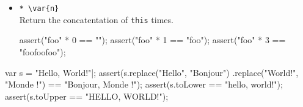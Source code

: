 \begin{itemize}
\item \lstinline|* \var{n}|\\
  Return the concatentation of \lstinline|this|  times.
\begin{urbiscript}
assert("foo" * 0 == "");
assert("foo" * 1 == "foo");
assert("foo" * 3 == "foofoofoo");
\end{urbiscript}
\end{itemize}

\begin{urbiscript}
var s = "Hello, World!\n"|;
assert(s.replace("Hello", "Bonjour")
        .replace("World!", "Monde !")
       == "Bonjour, Monde !\n");
assert(s.toLower == "hello, world!\n");
assert(s.toUpper == "HELLO, WORLD!\n");
\end{urbiscript}

